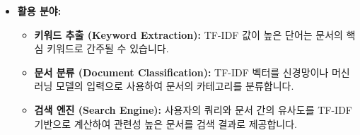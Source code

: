 \documentclass[11pt,a4paper]{article}
\begin{document}
\begin{itemize}
\begin{itemize}
        \item \textbf{목적:} 계산된 TF-IDF 벡터의 길이를 1로 만들어 단위 벡터(unit vector)로 변환합니다.
        \item \textbf{방법:} 각 벡터의 모든 요소를 해당 벡터의 L2 노름(Euclidean distance, 유클리드 거리)으로 나눕니다.
        $$ \text{정규화된 벡터 } \mathbf{v}' = \frac{\mathbf{v}}{||\mathbf{v}||_2} $$
        \item \textbf{L2 노름:} $||\mathbf{v}||_2 = \sqrt{v_1^2 + v_2^2 + \dots + v_k^2}$
        \item \textbf{효과:}
            \begin{itemize}
                \item \textbf{문서 길이의 영향 감소:} 문서의 길이가 길다고 해서 TF-IDF 벡터의 길이가 무조건 길어지는 것을 방지합니다.
                \item \textbf{방향성 강조:} 벡터의 '방향'에 초점을 맞춰 문서 간의 유사도를 측정할 때 '코사인 유사성(Cosine Similarity)'을 직접적으로 사용할 수 있게 합니다. 두 단위 벡터의 내적(dot product)은 두 벡터 사이의 코사인 값과 동일합니다.
                \item \textbf{모델 안정성:} 신경망의 입력으로 사용될 때, 입력 값의 스케일을 일정하게 유지하여 학습의 안정성을 높일 수 있습니다.
            \end{itemize}
        \item \textbf{논의:} TF 계산 시 이미 문서 길이로 나누어 정규화하는데, 최종적으로 다시 벡터 정규화를 하는 것이 중복이 아닌가 하는 의문이 있을 수 있습니다. 하지만 TF는 '단어 빈도'를 문서 길이로 정규화하는 것이고, 최종 벡터 정규화는 '문서 전체의 TF-IDF 벡터'의 길이를 정규화하는 것으로, 서로 다른 목적을 가집니다. 경험적으로 두 가지 정규화를 모두 적용하는 것이 좋은 성능을 보이는 경우가 많습니다.
    \end{itemize}
    \item \textbf{활용 분야:}
    \begin{itemize}
        \item \textbf{키워드 추출 (Keyword Extraction):} TF-IDF 값이 높은 단어는 문서의 핵심 키워드로 간주될 수 있습니다.
        \item \textbf{문서 분류 (Document Classification):} TF-IDF 벡터를 신경망이나 머신러닝 모델의 입력으로 사용하여 문서의 카테고리를 분류합니다.
        \item \textbf{검색 엔진 (Search Engine):} 사용자의 쿼리와 문서 간의 유사도를 TF-IDF 기반으로 계산하여 관련성 높은 문서를 검색 결과로 제공합니다.
    \end{itemize}
\end{itemize}
\end{document}
